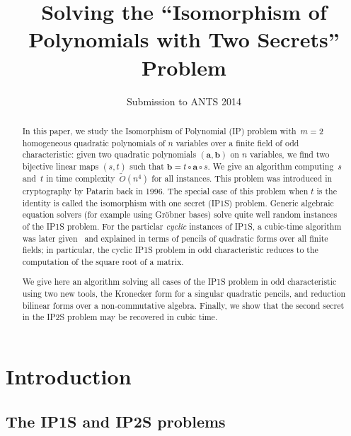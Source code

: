 \documentclass{lms}%
\def\Ot{\widetilde{O}}
\begin{document}
\title[Solving ``Isomorphism of Polynomials with Two Secrets'']%
{Solving the ``Isomorphism of Polynomials with Two Secrets'' Problem}%
\author{Submission to ANTS 2014}
\maketitle

\begin{abstract}%
In this paper, we study the Isomorphism of Polynomial (IP) problem
with~$m=2$ homogeneous quadratic polynomials of $n$ variables over a finite field of odd
characteristic: given two quadratic polynomials $(\bm{a},\bm{b})$ 
on $n$ variables, we find two bijective linear maps $(s,t)$ such that
$\bm{b}=t\circ \bm{a}\circ s$. We give an algorithm computing~$s$ and~$t$
in time complexity~$\Ot(n^4)$ for all instances.
This problem was introduced in cryptography by Patarin back in 1996.
The special case of this problem when $t$ is the identity is called
the isomorphism with one secret (IP1S) problem.
Generic algebraic equation solvers (for example using Gröbner bases)
solve quite well random instances of the IP1S problem. For the particlar
\emph{cyclic} instances of IP1S, a cubic-time algorithm was later
given~\cite{MPG2013} and explained in terms of pencils of quadratic forms
over all finite fields; in particular, the cyclic IP1S problem in odd
characteristic reduces to the computation of the square root of a matrix.

We give here an algorithm solving all cases of the IP1S problem in odd
characteristic using two new tools, the Kronecker form for a singular
quadratic pencils, and reduction bilinear forms over a non-commutative
algebra. Finally, we show that the second secret in the IP2S problem may
be recovered in cubic time.
\end{abstract}%
\section*{Introduction}%
\subsection*{The IP1S and IP2S problems}%
\end{document}
